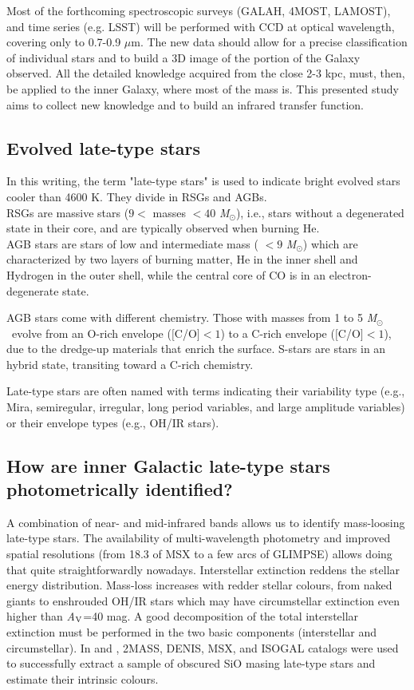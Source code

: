 \documentclass[final,11pt,onecolumn,a4paper,twoside]{scrbook_gj}
\newcommand{\Msun}{$\mathcal{M}_\odot$}
\def\Msun{\hbox{\it M$_\odot$}}
\newcommand{\um}{$\mu$m}
\def\Msun{\hbox{\it M$_\odot$}}
\newcommand{\Av}{{\it A$_{\rm V}$}}
\begin{document}
Most of the forthcoming spectroscopic 
surveys (GALAH, 4MOST, LAMOST), and time series (e.g. LSST)
will be performed  with CCD  at optical wavelength, covering 
only to 0.7-0.9 \um. The new data should allow
for a precise classification of individual stars
and to build a 3D image of the portion of the Galaxy observed.
All the detailed knowledge acquired from the close 2-3 kpc,
must, then, be applied to the inner Galaxy, 
where most of the mass is.
This presented study  aims
to collect  new knowledge and to 
build an infrared transfer function.

\subsection{Evolved late-type stars}
In this writing, the term "late-type stars" is used
to indicate bright evolved stars cooler than 4600 K.
They divide in RSGs and AGBs. \\
RSGs are massive stars ($9 <$ masses $<40$ \Msun),  
i.e., stars without a degenerated state in their 
core, and are typically observed when burning He.\\
AGB stars are stars of low and intermediate
mass ( $<9$ \Msun) which are characterized by 
two layers of burning matter, He in the inner shell
and Hydrogen in the outer shell, while the central core 
of CO is in an electron-degenerate state.

AGB stars come with different chemistry.
Those with masses from 1 to 5 \Msun\ 
evolve from an O-rich envelope ($[$C/O$] <1$)
to a C-rich envelope ($[$C/O$] <1$), 
due to the dredge-up materials
that enrich the surface. S-stars are stars 
in an hybrid state, transiting toward a C-rich chemistry.



Late-type stars are often named  with terms indicating 
their variability type (e.g., Mira, semiregular, 
irregular, long period variables, 
and large amplitude variables)
or their envelope types (e.g., OH/IR stars).


\subsection{How are inner Galactic late-type stars
photometrically identified?}

A combination of near- and mid-infrared bands
allows us to identify mass-loosing late-type stars.
The availability of multi-wavelength photometry
and improved spatial resolutions 
(from 18.3 of MSX to a few arcs of GLIMPSE)
allows doing that quite straightforwardly nowadays.
Interstellar extinction reddens the stellar energy distribution.
Mass-loss increases with  redder stellar colours, from 
naked giants to enshrouded OH/IR stars which may have 
circumstellar extinction even higher than \Av=40 mag.
A good decomposition of the total interstellar extinction
must be performed in the two basic components 
(interstellar and  circumstellar).
In \citet{messineo02} and \citet{messineo05}, 
2MASS, DENIS, MSX, and ISOGAL
catalogs were used to successfully extract a sample of 
obscured SiO masing late-type stars and estimate their
intrinsic colours.
\end{document}
